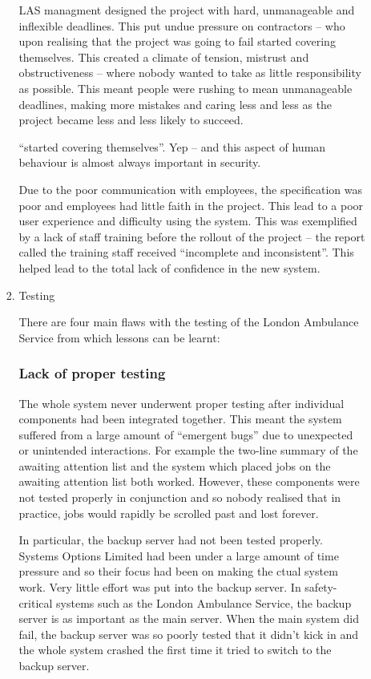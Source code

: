 \documentclass[10pt,\jkfside,a4paper]{article}
\begin{document}
\begin{enumerate}
\begin{enumerate}
\begin{enumerate}[label=(\roman*)]
LAS managment designed the project with hard, unmanageable and inflexible deadlines. This put undue 
pressure on contractors -- who upon realising that the project was going to fail started covering themselves. 
This created a climate of tension, mistrust and obstructiveness -- where nobody wanted to take as 
little responsibility as possible. This meant people were rushing to mean unmanageable deadlines, making 
more mistakes and caring less and less as the project became less and less likely to succeed.

{\color{blue} ``started covering themselves''. Yep -- and this aspect of human behaviour is almost always important in
security.}

Due to the poor communication with employees, the specification was poor and employees had little faith in 
the project. This lead to a poor user experience 
and difficulty using the system. This was exemplified by a lack of staff training before the rollout of the 
project -- the report called the training staff received ``incomplete and inconsistent''. This helped lead to 
the total lack of confidence in the new system.

\item Testing

There are four main flaws with the testing of the London Ambulance Service from which lessons can be learnt:

\subsubsection*{Lack of proper testing}

The whole system never underwent proper testing after individual components had been integrated together. 
This meant the system suffered from a large amount of ``emergent bugs'' due to unexpected 
or unintended interactions. For example the two-line summary of the awaiting attention list 
and the system which placed jobs on the awaiting attention list both worked. However, these components 
were not tested properly in conjunction and so nobody realised that in practice, jobs would rapidly be scrolled 
past and lost forever.

In particular, the backup server had not been tested properly. Systems Options Limited had been under a 
large amount of time pressure and so their focus had been on making the ctual system work. Very little 
effort was put into the backup server. In safety-critical systems such as the London Ambulance Service, 
the backup server is as important as the main server. When the main system did fail, the 
backup server was so poorly tested that it didn't kick in and the whole system crashed the first 
time it tried to switch to the backup server.


\end{enumerate}
\end{enumerate}
\end{enumerate}
\end{document}
